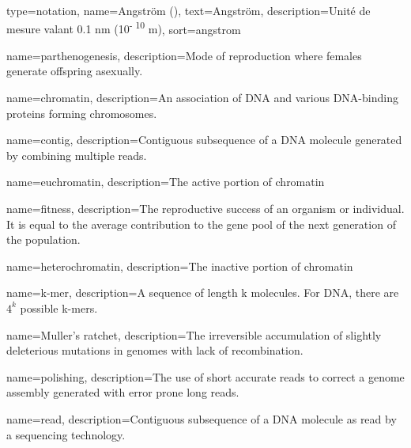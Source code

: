 



{
	type=notation,
	name={Angstr\" om (\angstrom)},
    text=Angstr\" om,
	description={Unité de mesure valant 0.1 nm (10\textsuperscript{- 10} m)},
	sort={angstrom}
}

{
		name={parthenogenesis},
		description={Mode of reproduction where females generate offspring asexually.}
}

{
		name={chromatin},
		description={An association of DNA and various DNA-binding proteins forming chromosomes.}
}

{
	name={contig},
	description={Contiguous subsequence of a DNA molecule generated by combining multiple reads.}
}

{
		name={euchromatin},
		description={The active portion of chromatin}
}

{
		name={fitness},
		description={The reproductive success of an organism or individual.  It is equal to the average contribution to the gene pool of the next generation of the population.}
}

{
		name={heterochromatin},
		description={The inactive portion of chromatin}
}

{
		name={k-mer},
		description={A sequence of length k molecules. For DNA, there are $4^k$ possible k-mers.}
}

{
		name={Muller's ratchet},
		description={The irreversible accumulation of slightly deleterious mutations in genomes with lack of recombination.}
}

{
	name={polishing},
	description={The use of short accurate reads to correct a genome assembly generated with error prone long reads.}
}

{
	name={read},
	description={Contiguous subsequence of a DNA molecule as read by a sequencing technology.}
}

